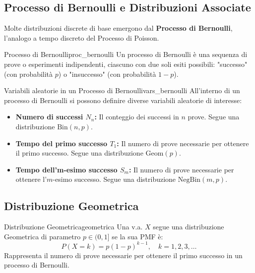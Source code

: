 \subsection{Processo di Bernoulli e Distribuzioni Associate}
Molte distribuzioni discrete di base emergono dal \textbf{Processo di Bernoulli}, l'analogo a tempo discreto del Processo di Poisson.

\begin{definizione}{Processo di Bernoulli}{proc_bernoulli}
Un processo di Bernoulli è una sequenza di prove o esperimenti indipendenti, ciascuno con due soli esiti possibili: "successo" (con probabilità \(p\)) o "insuccesso" (con probabilità \(1-p\)).
\end{definizione}

\begin{nota}{Variabili aleatorie in un Processo di Bernoulli}{vars_bernoulli}
All'interno di un processo di Bernoulli si possono definire diverse variabili aleatorie di interesse:
\begin{itemize}
    \item \textbf{Numero di successi \(N_n\):} Il conteggio dei successi in \(n\) prove. Segue una distribuzione \(\text{Bin}(n,p)\).
    \item \textbf{Tempo del primo successo \(T_1\):} Il numero di prove necessarie per ottenere il primo successo. Segue una distribuzione \(\text{Geom}(p)\).
    \item \textbf{Tempo dell'm-esimo successo \(S_m\):} Il numero di prove necessarie per ottenere l'\(m\)-esimo successo. Segue una distribuzione \(\text{NegBin}(m,p)\).
\end{itemize}
\end{nota}

\subsection{Distribuzione Geometrica}

\begin{definizione}{Distribuzione Geometrica}{geometrica}
Una v.a. \(X\) segue una distribuzione Geometrica di parametro \(p \in (0,1]\) se la sua PMF è:
\[
P(X=k) = p(1-p)^{k-1}, \quad k=1, 2, 3, \dots
\]
Rappresenta il numero di prove necessarie per ottenere il primo successo in un processo di Bernoulli.
\end{definizione}

